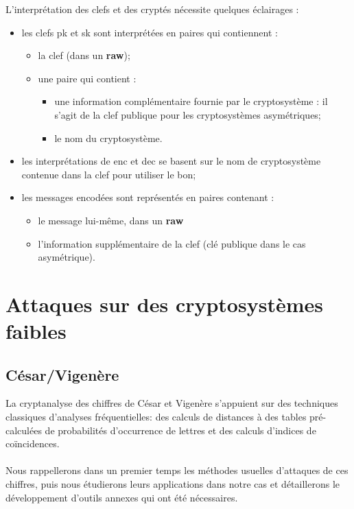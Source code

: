 \documentclass[11pt]{article} %
\begin{document}
L'interprétation des clefs et des cryptés nécessite quelques éclairages :
\begin{itemize}
  \item les clefs pk et sk sont interprétées en paires qui contiennent :
  \begin{itemize}
    \item la clef (dans un \textbf{raw});
    \item une paire qui contient :
    \begin{itemize}
      \item une information complémentaire fournie par le cryptosystème : il s'agit de la clef publique pour les cryptosystèmes asymétriques;
      \item le nom du cryptosystème.
    \end{itemize}
  \end{itemize}
  \item les interprétations de enc et dec se basent sur le nom de cryptosystème contenue dans la clef pour utiliser le bon;
  \item les messages encodées sont représentés en paires contenant :
  \begin{itemize}
  \item le message lui-même, dans un \textbf{raw}
  \item l'information supplémentaire de la clef (clé publique dans le cas asymétrique).
  \end{itemize}
\end{itemize}

\section{Attaques sur des cryptosystèmes faibles}

\subsection{César/Vigenère}


 La cryptanalyse des chiffres de César et Vigenère s'appuient sur des techniques classiques d'analyses
fréquentielles: des calculs de distances à des tables pré-calculées de probabilités d'occurrence de lettres et des calculs d'indices de coïncidences.\\\\
    Nous rappellerons dans un premier temps les méthodes usuelles d'attaques de ces chiffres, puis nous étudierons leurs applications dans notre cas et détaillerons le développement d'outils annexes qui ont été nécessaires.
\end{document}
